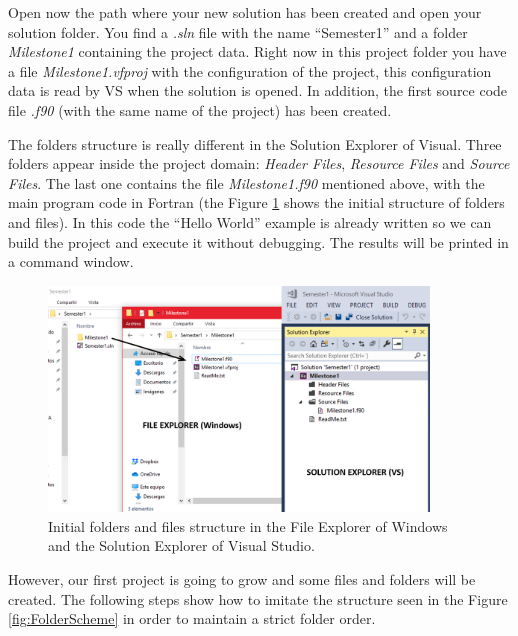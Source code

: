 Open now the path where your new solution has been created and open your solution folder. You find a \textit{.sln} file with the name ``Semester1'' and a folder \textit{Milestone1} containing the project data. Right now in this project folder you have a file \textit{Milestone1.vfproj} with the configuration of the project, this configuration data is read by VS when the solution is opened. In addition, the first source code file \textit{.f90} (with the same name of the project) has been created.

The folders structure is really different in the Solution Explorer of Visual. Three folders appear inside the project domain: \textit{Header Files}, \textit{Resource Files} and \textit{Source Files}. The last one contains the file \textit{Milestone1.f90} mentioned above, with the main program code in Fortran (the Figure \ref{fig:Intro2} shows the initial structure of folders and files). In this code the ``Hello World'' example is already written so we can build the project and execute it without debugging. The results will be printed in a command window. 

\begin{figure}
    \centering
    \includegraphics[width= 0.9\textwidth]{Figures/Intro2}
    \caption{Initial folders and files structure in the File Explorer of Windows and the Solution Explorer of Visual Studio.}
    \label{fig:Intro2}
\end{figure}

However, our first project is going to grow and some files and folders will be created. The following steps show how to imitate the structure seen in the Figure \ref{fig:FolderScheme} in order to maintain a strict folder order. 

